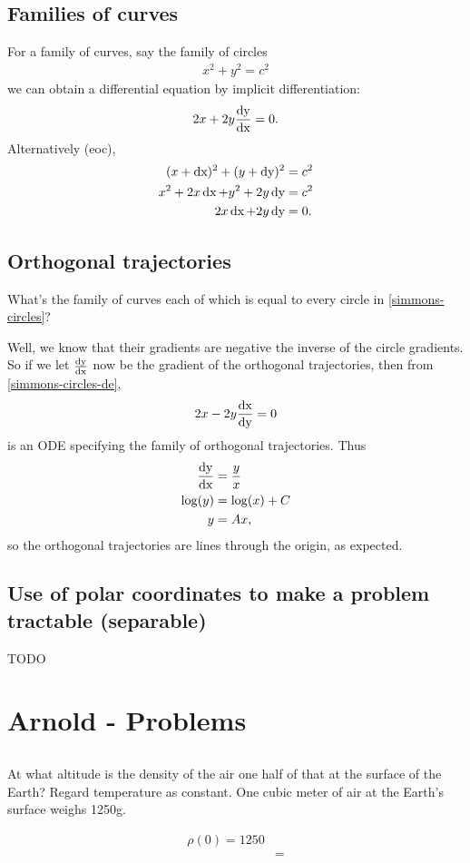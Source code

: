 \subsection{Families of curves}
For a family of curves, say the family of circles
\begin{align}
  x^2 + y^2 = c^2 \label{simmons-circles}
\end{align}
we can obtain a differential equation by implicit differentiation:
\begin{align}
  2x + 2y\frac{\operatorname{\text{dy}}}{\operatorname{\text{dx}}} = 0. \label{simmons-circles-de}
\end{align}
Alternatively (eoc),
\begin{align*}
  (x + \operatorname{\text{dx}})^2 + (y + \operatorname{\text{dy}})^2 &= c^2\\
  x^2 + 2x\operatorname{\text{dx}} + y^2 + 2y\operatorname{\text{dy}} &= c^2\\
        2x\operatorname{\text{dx}}  + 2y\operatorname{\text{dy}}     &= 0.
\end{align*}

\subsection{Orthogonal trajectories}
What's the family of curves each of which is equal to every circle in \eqref{simmons-circles}?

Well, we know that their gradients are negative the inverse of the circle
gradients. So if we let $\frac{\operatorname{\text{dy}}}{\operatorname{\text{dx}}}$ now be the gradient of the orthogonal
trajectories, then from \eqref{simmons-circles-de},
\begin{align*}
  2x - 2y\frac{\operatorname{\text{dx}}}{\operatorname{\text{dy}}} = 0
\end{align*}
is an ODE specifying the family of orthogonal trajectories. Thus
\begin{align*}
  \frac{\operatorname{\text{dy}}}{\operatorname{\text{dx}}} &= \frac{y}{x}\\
  \log(y) &= \log(x) + C\\
       y &= Ax,
\end{align*}
so the orthogonal trajectories are lines through the origin, as expected.

\subsection{Use of polar coordinates to make a problem tractable (separable)}
TODO

\section{Arnold - Problems}
\subsection{}
\begin{mdframed}
  At what altitude is the density of the air one half of that at the surface of
  the Earth? Regard temperature as constant. One cubic meter of air at the
  Earth's surface weighs 1250g.
\end{mdframed}
\begin{align*}
  \rho(0) = 1250\\
  &=
\end{align*}